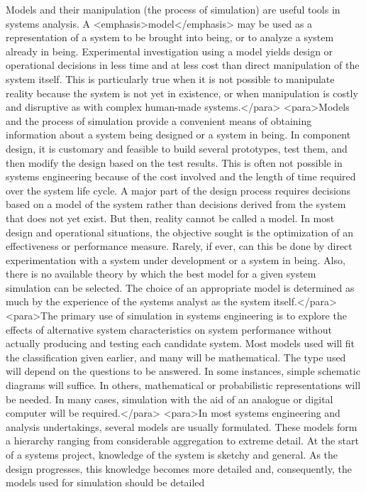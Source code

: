 Models and their manipulation (the process of simulation) are useful tools in systems analysis. A <emphasis>model</emphasis> may be used as a representation of a system to be brought into being, or to analyze a system already in being. Experimental investigation using a model yields design or operational decisions in less time and at less cost than direct manipulation of the system itself. This is particularly true when it is not possible to manipulate reality because the system is not yet in existence, or when manipulation is costly and disruptive as with complex human-made systems.</para>
	<para>Models and the process of simulation provide a convenient means of obtaining information about a system being designed or a system in being. In component design, it is customary and feasible to build several prototypes, test them, and then modify the design based on the test results. This is often not possible in systems engineering because of the cost involved and the length of time required over the system life cycle. A major part of the design process requires decisions based on a model of the system rather than decisions derived from the system that does not yet exist. But then, reality cannot be called a model.
	In most design and operational situations, the objective sought is the optimization of an effectiveness or performance measure. Rarely, if ever, can this be done by direct experimentation with a system under development or a system in being. Also, there is no available theory by which the best model for a given system simulation can be selected. The choice of an appropriate model is determined as much by the experience of the systems analyst as the system itself.</para>
<para>The primary use of simulation in systems engineering is to explore the effects of alternative system characteristics on system performance without actually producing and testing each candidate system. Most models used will fit the classification given earlier, and many will be mathematical. The type used will depend on the questions to be answered. In some instances, simple schematic diagrams will suffice. In others, mathematical or probabilistic representations will be needed. In many cases, simulation with the aid of an analogue or digital computer will be required.</para>
<para>In most systems engineering and analysis undertakings, several models are usually formulated. These models form a hierarchy ranging from considerable aggregation to extreme detail. At the start of a systems project, knowledge of the system is sketchy and general. As the design progresses, this knowledge becomes more detailed and, consequently, the models used for simulation should be detailed

